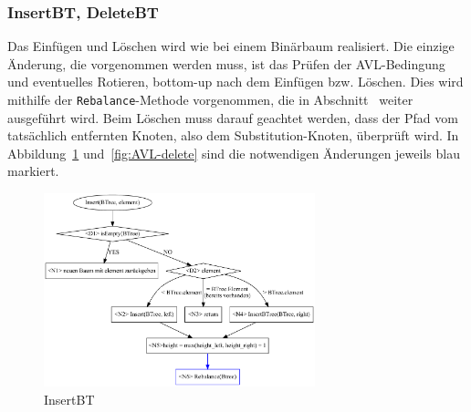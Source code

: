 \subsubsection{InsertBT, DeleteBT}
Das Einfügen und Löschen wird wie bei einem Binärbaum realisiert.
Die einzige Änderung, die vorgenommen werden muss, ist das Prüfen der
AVL-Bedingung und eventuelles Rotieren, bottom-up nach dem Einfügen bzw. Löschen.
Dies wird mithilfe der \verb|Rebalance|-Methode vorgenommen, die in
Abschnitt~ weiter ausgeführt wird.
Beim Löschen muss darauf geachtet werden, dass der Pfad vom tatsächlich entfernten Knoten, also
dem Substitution-Knoten, überprüft wird.
In Abbildung~\ref{fig:AVL-insert} und~\ref{fig:AVL-delete} sind die notwendigen Änderungen jeweils
blau markiert.

\begin{figure}[htbp]
    \centering
    \includegraphics[width= 0.70\textwidth]{img/gv/insert}
    \caption{InsertBT}
    \label{fig:AVL-insert}
\end{figure}
